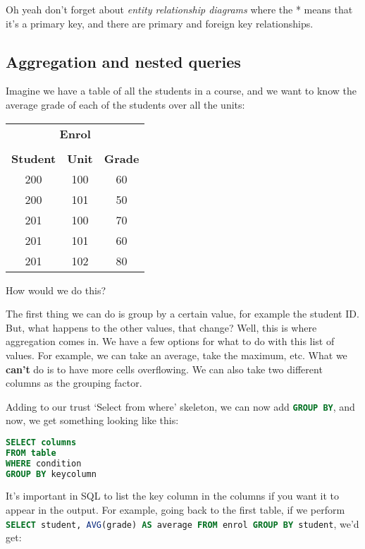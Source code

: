 \documentclass[11pt,a4paper,titlepage,dvipsnames,cmyk]{scrartcl}
\begin{document}
Oh yeah don't forget about \textit{entity relationship diagrams} where the
* means that it's a primary key, and there are primary and foreign key
relationships.

\subsection{Aggregation and nested queries}%
\label{sub:aggregation}

Imagine we have a table of all the students in a course, and we want to
know the average grade of each of the students over all the units:

\begin{center}
    \begin{tabular}{|c|c|c|}
        \multicolumn{3}{c}{\textbf{Enrol}} \\
        \multicolumn{3}{c}{} \\
        \hline
        \textbf{Student} & \textbf{Unit} & \textbf{Grade} \\
        \hhline{|=|=|=|}
        200 & 100 & 60 \\ \hline
        200 & 101 & 50 \\ \hline
        201 & 100 & 70 \\ \hline
        201 & 101 & 60 \\ \hline
        201 & 102 & 80 \\ \hline
    \end{tabular}
\end{center}

How would we do this?

The first thing we can do is group by a certain value, for example the
student ID. But, what happens to the other values, that change? Well, this
is where aggregation comes in. We have a few options for what to do with
this list of values. For example, we can take an average, take the
maximum, etc. What we \textbf{can't} do is to have more cells overflowing.
We can also take two different columns as the grouping factor.

Adding to our trust `Select from where' skeleton, we can now add
\lstinline[language=SQL]|GROUP BY|, and now, we get something looking like this:

\begin{lstlisting}[language=SQL]
SELECT columns
FROM table
WHERE condition
GROUP BY keycolumn
\end{lstlisting}

It's important in SQL to list the key column in the columns if you want it
to appear in the output. For example, going back to the first table, if we
perform \lstinline[language=SQL]|SELECT student, AVG(grade) AS average FROM enrol GROUP BY student|, we'd get:
\end{document}
